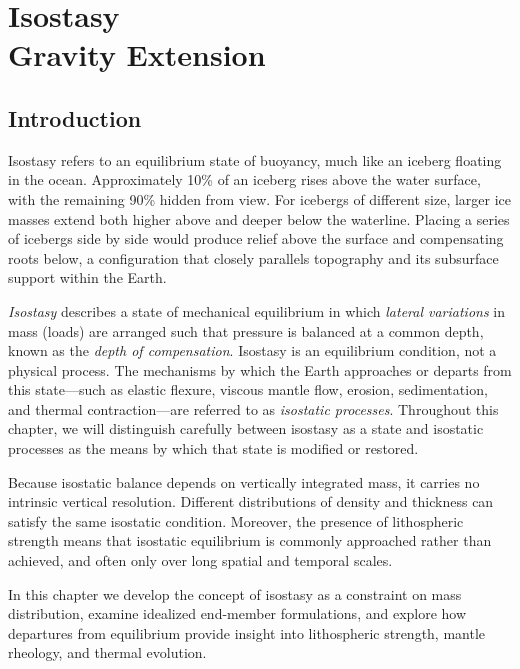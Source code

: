 \chapter[Isostasy]{Isostasy\\ \large Gravity Extension}\label{ch:isostasy}

\section*{Introduction}

Isostasy refers to an equilibrium state of buoyancy, much like an iceberg floating in the ocean.  Approximately 10\% of an iceberg rises above the water surface, with the remaining 90\% hidden from view.  For icebergs of different size, larger ice masses extend both higher above and deeper below the waterline.  Placing a series of icebergs side by side would produce relief above the surface and compensating roots below, a configuration that closely parallels topography and its subsurface support within the Earth.

\emph{Isostasy} describes a state of mechanical equilibrium in which \emph{lateral variations} in mass (loads) are arranged such that pressure is balanced at a common depth, known as the \emph{depth of compensation}.  Isostasy is an equilibrium condition, not a physical process.  The mechanisms by which the Earth approaches or departs from this state—such as elastic flexure, viscous mantle flow, erosion, sedimentation, and thermal contraction—are referred to as \emph{isostatic processes}.  Throughout this chapter, we will distinguish carefully between isostasy as a state and isostatic processes as the means by which that state is modified or restored.

Because isostatic balance depends on vertically integrated mass, it carries no intrinsic vertical resolution.  Different distributions of density and thickness can satisfy the same isostatic condition.  Moreover, the presence of lithospheric strength means that isostatic equilibrium is commonly approached rather than achieved, and often only over long spatial and temporal scales.

In this chapter we develop the concept of isostasy as a constraint on mass distribution, examine idealized end-member formulations, and explore how departures from equilibrium provide insight into lithospheric strength, mantle rheology, and thermal evolution.

